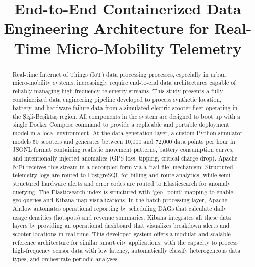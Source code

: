 \documentclass[conference]{IEEEtran}
\begin{document}
\title{End-to-End Containerized Data Engineering Architecture for Real-Time Micro-Mobility Telemetry}

\author{
\and

}

\maketitle

\begin{abstract}
Real-time Internet of Things (IoT) data processing processes, especially in urban micro-mobility systems, increasingly require end-to-end data architectures capable of reliably managing high-frequency telemetry streams. This study presents a fully containerized data engineering pipeline developed to process synthetic location, battery, and hardware failure data from a simulated electric scooter fleet operating in the Şişli-Beşiktaş region. All components in the system are designed to boot up with a single Docker Compose command to provide a replicable and portable deployment model in a local environment. At the data generation layer, a custom Python simulator models 50 scooters and generates between 10,000 and 72,000 data points per hour in JSONL format containing realistic movement patterns, battery consumption curves, and intentionally injected anomalies (GPS loss, tipping, critical charge drop). Apache NiFi receives this stream in a decoupled form via a 'tail-file' mechanism; Structured telemetry logs are routed to PostgreSQL for billing and route analytics, while semi-structured hardware alerts and error codes are routed to Elasticsearch for anomaly querying. The Elasticsearch index is structured with 'geo\_point' mapping to enable geo-queries and Kibana map visualizations. In the batch processing layer, Apache Airflow automates operational reporting by scheduling DAGs that calculate daily usage densities (hotspots) and revenue summaries. Kibana integrates all these data layers by providing an operational dashboard that visualizes breakdown alerts and scooter locations in real time. This developed system offers a modular and scalable reference architecture for similar smart city applications, with the capacity to process high-frequency sensor data with low latency, automatically classify heterogeneous data types, and orchestrate periodic analyses.
\end{abstract}
\end{document}
